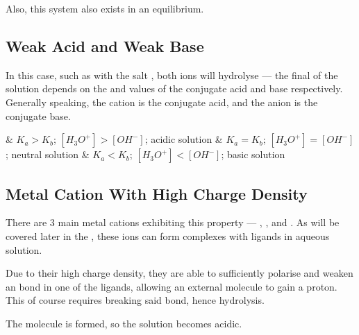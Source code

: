 			Also, this system also exists in an equilibrium.



		\pagebreak
		\subsection{Weak Acid and Weak Base}

			In this case, such as with the salt , both ions will hydrolyse --- the final \pH{} of the solution depends on
			the \Ka{} and \Kb{} values of the conjugate acid and base respectively. Generally speaking, the cation is the conjugate acid,
			and the anion is the conjugate base.

			\begin{bulletlist}
				& $K_{a} > K_{b}$;\hspace{4mm} $[H_{3}O^{+}] > [OH^{-}]$;\hspace{4mm} acidic solution
				& $K_{a} = K_{b}$;\hspace{4mm} $[H_{3}O^{+}] = [OH^{-}]$;\hspace{4mm} neutral solution
				& $K_{a} < K_{b}$;\hspace{4mm} $[H_{3}O^{+}] < [OH^{-}]$;\hspace{4mm} basic solution
			\end{bulletlist}



		\subsection{Metal Cation With High Charge Density}

			There are 3 main metal cations exhibiting this property --- , , and . As will be covered later
			in the , these ions can form complexes with  ligands in aqueous solution.

			Due to their high charge density, they are able to sufficiently polarise and weaken an  bond in one of the ligands,
			allowing an external  molecule to gain a proton. This of course requires breaking said  bond, hence hydrolysis.

			The  molecule is formed, so the solution becomes acidic.




